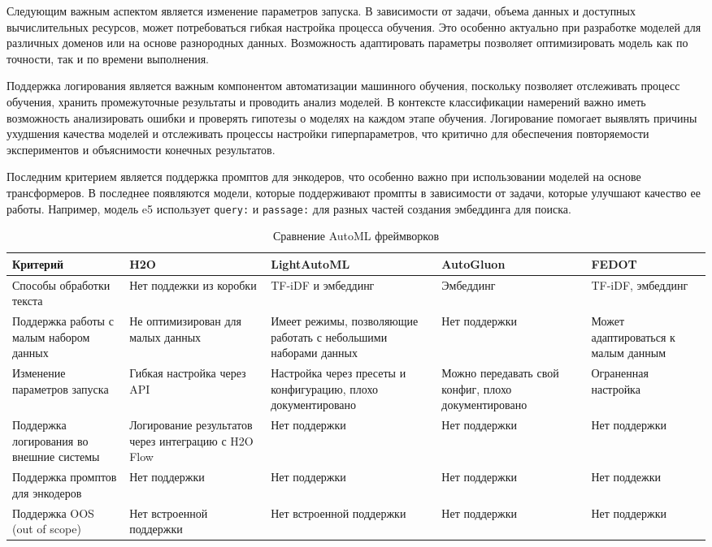 \documentclass[14pt,a4paper,oneside,openany]{extbook}
\begin{document}
Следующим важным аспектом является изменение параметров запуска. В зависимости от задачи, объема данных и доступных вычислительных ресурсов, может потребоваться гибкая настройка процесса обучения. Это особенно актуально при разработке моделей для различных доменов или на основе разнородных данных. Возможность адаптировать параметры позволяет оптимизировать модель как по точности, так и по времени выполнения.

Поддержка логирования является важным компонентом автоматизации машинного обучения, поскольку позволяет отслеживать процесс обучения, хранить промежуточные результаты и проводить анализ моделей. В контексте классификации намерений важно иметь возможность анализировать ошибки и проверять гипотезы о моделях на каждом этапе обучения. Логирование помогает выявлять причины ухудшения качества моделей и отслеживать процессы настройки гиперпараметров, что критично для обеспечения повторяемости экспериментов и объяснимости конечных результатов.

Последним критерием является поддержка промптов для энкодеров, что особенно важно при использовании моделей на основе трансформеров. В последнее появляются модели, которые поддерживают промпты в зависимости от задачи, которые улучшают качество ее работы. Например, модель e5\autocite{wang_multilingual_2024} использует \texttt{query:} и \texttt{passage:} для разных частей создания эмбеддинга для поиска.

\begin{table}[h!]
\caption{\label{tbl:automl_comparison}Сравнение AutoML фреймворков}
\centering
\begin{tabular}{|p{3cm}|p{3cm}|p{3cm}|p{3cm}|p{3cm}|}
\hline
Критерий & H2O & LightAutoML & AutoGluon & FEDOT\\
\hline
Способы обработки текста & Нет поддежки из коробки & TF-iDF\autocite{joneskarensparck_statistical_1972} и эмбеддинг & Эмбеддинг & TF-iDF, эмбеддинг\\
\hline
Поддержка работы с малым набором данных & Не оптимизирован для малых данных & Имеет режимы, позволяющие работать с небольшими наборами данных & Нет поддержки & Может адаптироваться к малым данным\\
\hline
Изменение параметров запуска & Гибкая настройка через API & Настройка через пресеты и конфигурацию, плохо документировано & Можно передавать свой конфиг, плохо документировано & Ограненная настройка\\
\hline
Поддержка логирования во внешние системы & Логирование результатов через интеграцию с H2O Flow & Нет поддержки & Нет поддержки & Нет поддержки\\
\hline
Поддержка промптов для энкодеров & Нет поддержки & Нет поддержки & Нет поддержки & Нет поддежки\\
\hline
Поддержка OOS (out of scope) & Нет встроенной поддержки & Нет встроенной поддержки & Нет поддержки & Нет поддержки\\
\hline
\end{tabular}
\end{table}
\end{document}
